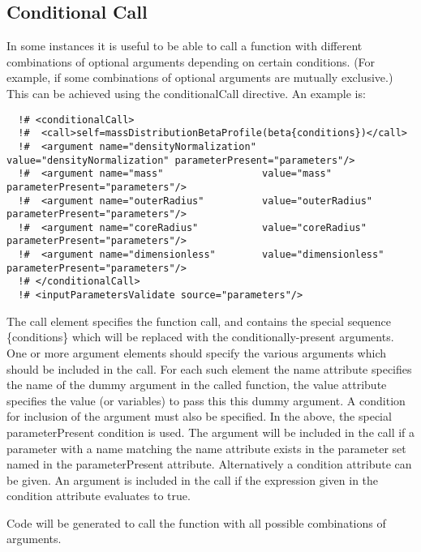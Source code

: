 \subsection{Conditional Call}

In some instances it is useful to be able to call a function with different combinations of optional arguments depending on certain conditions. (For example, if some combinations of optional arguments are mutually exclusive.) This can be achieved using the {\normalfont \ttfamily conditionalCall} directive. An example is:
\begin{verbatim}
  !# <conditionalCall>
  !#  <call>self=massDistributionBetaProfile(beta{conditions})</call>
  !#  <argument name="densityNormalization" value="densityNormalization" parameterPresent="parameters"/>
  !#  <argument name="mass"                 value="mass"                 parameterPresent="parameters"/>
  !#  <argument name="outerRadius"          value="outerRadius"          parameterPresent="parameters"/>
  !#  <argument name="coreRadius"           value="coreRadius"           parameterPresent="parameters"/>
  !#  <argument name="dimensionless"        value="dimensionless"        parameterPresent="parameters"/>
  !# </conditionalCall>
  !# <inputParametersValidate source="parameters"/>
\end{verbatim}
The {\normalfont \ttfamily call} element specifies the function call, and contains the special sequence {\normalfont \ttfamily \{conditions\}} which will be replaced with the conditionally-present arguments. One or more {\normalfont \ttfamily argument} elements should specify the various arguments which should be included in the call. For each such element the {\normalfont \ttfamily name} attribute specifies the name of the dummy argument in the called function, the {\normalfont \ttfamily value} attribute specifies the value (or variables) to pass this this dummy argument. A condition for inclusion of the argument must also be specified. In the above, the special {\normalfont \ttfamily parameterPresent} condition is used. The argument will be included in the call if a parameter with a name matching the {\normalfont \ttfamily name} attribute exists in the parameter set named in the {\normalfont \ttfamily parameterPresent} attribute. Alternatively a {\normalfont \ttfamily condition} attribute can be given. An argument is included in the call if the expression given in the {\normalfont \ttfamily condition} attribute evaluates to true.

Code will be generated to call the function with all possible combinations of arguments.

